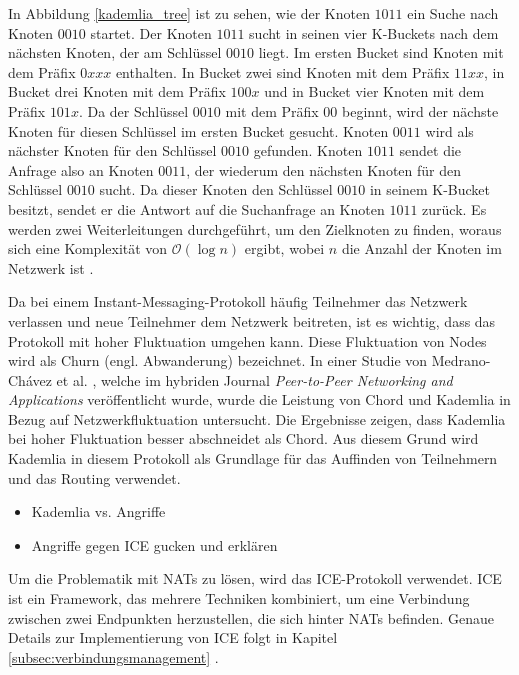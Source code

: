 \noindent In Abbildung \ref{kademlia_tree} ist zu sehen, wie der Knoten $1011$ ein Suche nach Knoten $0010$ startet. Der Knoten $1011$ sucht in seinen vier K-Buckets nach dem nächsten Knoten, der am Schlüssel $0010$ liegt. Im ersten Bucket sind Knoten mit dem Präfix $0xxx$ enthalten. In Bucket zwei sind Knoten mit dem Präfix $11xx$, in Bucket drei Knoten mit dem Präfix $100x$ und in Bucket vier Knoten mit dem Präfix $101x$. Da der Schlüssel $0010$ mit dem Präfix $00$ beginnt, wird der nächste Knoten für diesen Schlüssel im ersten Bucket gesucht. Knoten $0011$ wird als nächster Knoten für den Schlüssel $0010$ gefunden. Knoten $1011$ sendet die Anfrage also an Knoten $0011$, der wiederum den nächsten Knoten für den Schlüssel $0010$ sucht. Da dieser Knoten den Schlüssel $0010$ in seinem K-Bucket besitzt, sendet er die Antwort auf die Suchanfrage an Knoten $1011$ zurück. Es werden zwei Weiterleitungen durchgeführt, um den Zielknoten zu finden, woraus sich eine Komplexität von $\mathcal{O}(\log n)$ ergibt, wobei $n$ die Anzahl der Knoten im Netzwerk ist \parencite[S. 812]{MedranoChavez_ChordKademliaHighChurnScenarios}.    


Da bei einem Instant-Messaging-Protokoll häufig Teilnehmer das Netzwerk verlassen und neue Teilnehmer dem Netzwerk beitreten, ist es wichtig, dass das Protokoll mit hoher Fluktuation umgehen kann. Diese Fluktuation von Nodes wird als Churn (engl. Abwanderung) bezeichnet. In einer Studie von Medrano-Chávez et al. \parencite{MedranoChavez_ChordKademliaHighChurnScenarios}, welche im hybriden Journal \textit{Peer-to-Peer Networking and Applications} veröffentlicht wurde, wurde die Leistung von Chord und Kademlia in Bezug auf Netzwerkfluktuation untersucht. Die Ergebnisse zeigen, dass Kademlia bei hoher Fluktuation besser abschneidet als Chord. Aus diesem Grund wird Kademlia in diesem Protokoll als Grundlage für das Auffinden von Teilnehmern und das Routing verwendet.



\begin{itemize}
    \item Kademlia vs. Angriffe
    \item Angriffe gegen ICE gucken und erklären
\end{itemize}

\noindent Um die Problematik mit NATs zu lösen, wird das ICE-Protokoll verwendet. ICE ist ein Framework, das mehrere Techniken kombiniert, um eine Verbindung zwischen zwei Endpunkten herzustellen, die sich hinter NATs befinden. Genaue Details zur Implementierung von ICE folgt in Kapitel \ref{subsec:verbindungsmanagement} \textit{}.


